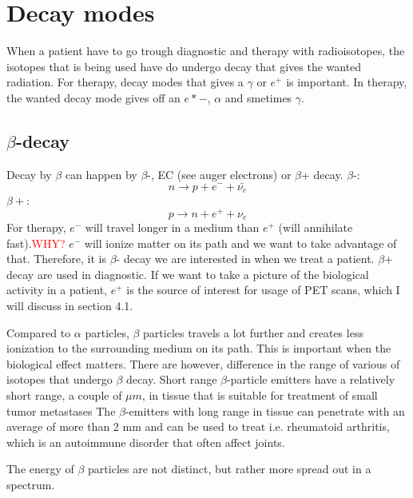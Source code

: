 \documentclass[twoside,english]{uiofysmaster/uiofysmaster}
\begin{document}
 
\section{Decay modes}
\label{sec:decaymodes}

When a patient have to go trough diagnostic and therapy with radioisotopes, the isotopes that is being used have do undergo decay that gives the wanted radiation. For therapy, decay modes  that gives a $\gamma$ or $e^{+}$ is important. In therapy, the wanted decay mode gives off an $e*{-}$, $\alpha$ and smetimes $\gamma$.

\subsection{$\beta$-decay}

Decay by $\beta$ can happen by $\beta$-, EC (see auger electrons) or $\beta$+ decay.
$\beta$-:
\begin{equation}
n \rightarrow p + e^- + \bar{\nu_e} 
\end{equation}
$\beta+$:
\begin{equation}
p \rightarrow n + e^+ + \nu_e
\end{equation}
For therapy, $e^-$ will travel longer in a medium than $e^+$ (will annihilate fast).\textcolor{red}{WHY?} $e^-$ will ionize matter on its path and we want to take advantage of that. Therefore, it is $\beta$- decay we are interested in when we treat a patient. $\beta$+ decay are used in diagnostic. If we want to take a picture of the biological activity in a patient, $e^+$ is the source of interest for usage of PET scans, which I will discuss in section 4.1.

Compared to $\alpha$ particles, $\beta$ particles travels a lot further and creates less ionization to the surrounding medium on its path. This is important when the biological effect matters. There are however, difference in the range of various of isotopes that undergo $\beta$ decay. Short range $\beta$-particle emitters have a relatively short range, a couple of $\mu m$, in tissue that is suitable for treatment of small tumor metastases%
The $\beta$-emitters with long range in tissue can penetrate with an average of more than 2 mm and can be used to treat i.e. rheumatoid arthritis, which is an autoimmune disorder that often affect joints.

The energy of $\beta$ particles are not distinct, but rather more spread out in a spectrum.

\end{document}
